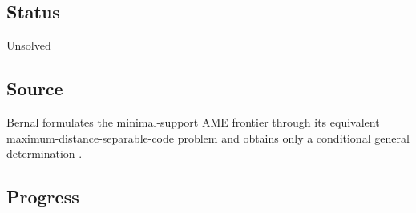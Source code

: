\subsection*{Status}

Unsolved

\subsection*{Source}

Bernal formulates the minimal-support AME frontier through its equivalent
maximum-distance-separable-code problem and obtains only a conditional general
determination .

\subsection*{Progress}

